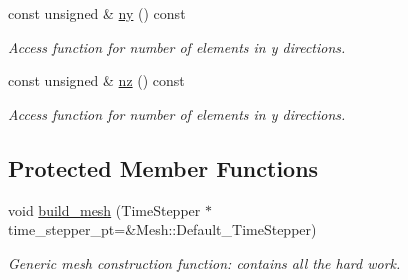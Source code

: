\begin{DoxyCompactItemize}
const unsigned \& \hyperlink{classoomph_1_1SimpleCubicMesh_a16979ec3b0e88fb37730415190021c1c}{ny} () const
\begin{DoxyCompactList}\small\item\em Access function for number of elements in y directions. \end{DoxyCompactList}\item 
const unsigned \& \hyperlink{classoomph_1_1SimpleCubicMesh_ad78725440e4e87598fd9339653b28e61}{nz} () const
\begin{DoxyCompactList}\small\item\em Access function for number of elements in y directions. \end{DoxyCompactList}\end{DoxyCompactItemize}
\subsection*{Protected Member Functions}
\begin{DoxyCompactItemize}
\item 
void \hyperlink{classoomph_1_1SimpleCubicMesh_aea141bf600aaed7c7c9ccfa3f4f1edfc}{build\+\_\+mesh} (Time\+Stepper $\ast$time\+\_\+stepper\+\_\+pt=\&Mesh\+::\+Default\+\_\+\+Time\+Stepper)
\begin{DoxyCompactList}\small\item\em Generic mesh construction function\+: contains all the hard work. \end{DoxyCompactList}\end{DoxyCompactItemize}
